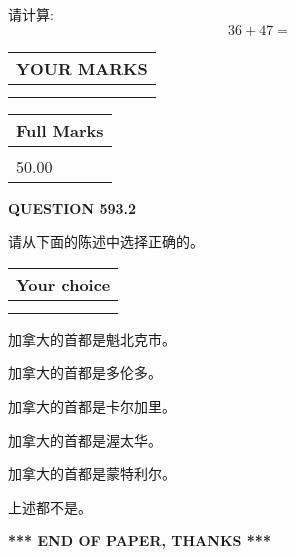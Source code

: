 \documentclass{ctexart}
\begin{document}
  
 
请计算:
\begin{equation}
36 +  %
47 = \nonumber
\end{equation}
 

 

 
  
\vspace{0.2in}
  
\noindent\begin{tabular}{|l|}
\hline
 YOUR MARKS  \\
\hline
 \\ 
 \\ 
\hline
\end{tabular}
\hspace{0.05in} \begin{tabular}{|l|}
\hline
 Full Marks  \\
\hline
 \\ 
50.00 \\
\hline
\end{tabular}
{\textbf{\Large{QUESTION
593.2 
}}}
  
  
请从下面的陈述中选择正确的。
  
  
\noindent\hspace{3.0in} \begin{tabular}{|l|}
\hline
Your choice \\
\hline
 \\ 
 \\ 
\hline
\end{tabular}
  
  
 
 
加拿大的首都是魁北克市。
 
 
加拿大的首都是多伦多。
 
 
加拿大的首都是卡尔加里。
 
 
加拿大的首都是渥太华。
 
 
加拿大的首都是蒙特利尔。
 
 
 上述都不是。
 
 
   
   
 \vspace{0.2in}
 
   
   
   
   
\vspace{1.0in} 
{\textbf{\large{ *** END OF PAPER, THANKS *** }}} 
   
\end{document}
